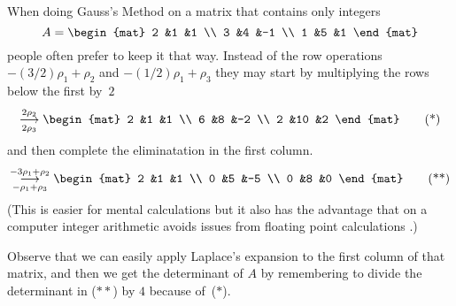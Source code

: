 
When doing Gauss's Method on a matrix that contains only integers
\begin{equation*}
  A=
  \begin{mat}
    2 &1 &1 \\
    3 &4 &-1 \\
    1 &5 &1 
  \end{mat}
\end{equation*}
people often prefer to keep it that way.
Instead of the row operations $-(3/2)\rho_1+\rho_2$ and
$-(1/2)\rho_1+\rho_3$ they may start by multiplying the rows below the first
by~$2$
\begin{equation*}
  \grstep[2\rho_3]{2\rho_2}
  \begin{mat}
    2 &1 &1 \\
    6 &8 &-2 \\
    2 &10 &2 
  \end{mat}
  \tag{*}
\end{equation*}
and then complete the eliminatation in the first column.
\begin{equation*}
  \grstep[-\rho_1+\rho_3]{-3\rho_1+\rho_2}
  \begin{mat}
    2 &1 &1 \\
    0 &5 &-5 \\
    0 &8 &0 
  \end{mat}
  \tag{**}
\end{equation*}
(This is easier for mental calculations but it also has the advantage
that on a computer integer arithmetic 
avoids issues from floating point calculations \cite{Kahan}.)

Observe that we can easily apply Laplace's expansion to the first column of that
matrix, and then we get the determinant of $A$ by 
remembering to divide the determinant in ($**$) by $4$ because of~($*$).


